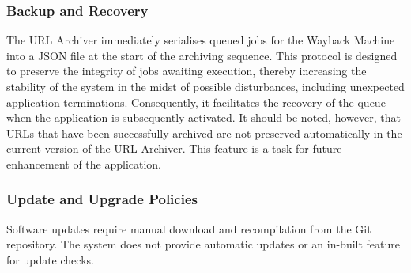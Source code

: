\subsubsection{Backup and Recovery}
The URL Archiver immediately serialises queued jobs for the Wayback Machine into a JSON file at the start of the archiving sequence. This protocol is designed to preserve the integrity of jobs awaiting execution, thereby increasing the stability of the system in the midst of possible disturbances, including unexpected application terminations. Consequently, it facilitates the recovery of the queue when the application is subsequently activated. It should be noted, however, that URLs that have been successfully archived are not preserved automatically in the current version of the URL Archiver. This feature is a task for future enhancement of the application.

\subsubsection{Update and Upgrade Policies}
Software updates require manual download and recompilation from the Git repository. The system does not provide automatic updates or an in-built feature for update checks.